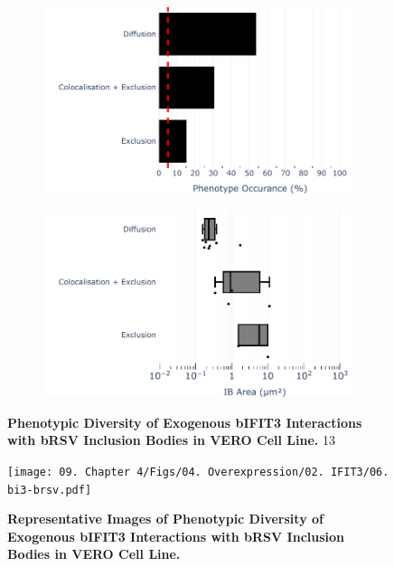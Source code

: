 \begin{figure}
    \begin{subfigure}{0.495\textwidth}
        \caption{}
        \includegraphics[width=1\linewidth]{09. Chapter 4/Figs/04. Overexpression/02. IFIT3/04. bar_i3_brsv.pdf} 
    \end{subfigure}
    \begin{subfigure}{0.495\textwidth}
        \caption{}
        \includegraphics[width=1\linewidth]{09. Chapter 4/Figs/04. Overexpression/02. IFIT3/05. box_i3_brsv.pdf}
    \end{subfigure}
    \caption[Phenotypic Diversity of Exogenous bIFIT3 Interactions with bRSV Inclusion Bodies in VERO Cell Line.]{\textbf{Phenotypic Diversity of Exogenous bIFIT3 Interactions with bRSV Inclusion Bodies in VERO Cell Line.} 13}
    \label{fig:Phenotypic Diversity of Exogenous bIFIT3 Interactions with bRSV Inclusion Bodies in VERO Cell Line}
\end{figure}

\begin{figure}
    \centering
    \texttt{[image: 09. Chapter 4/Figs/04. Overexpression/02. IFIT3/06. bi3-brsv.pdf]}
    \caption[Representative Images of Phenotypic Diversity of Exogenous bIFIT3 Interactions with bRSV Inclusion Bodies in VERO Cell Line.]{\textbf{Representative Images of Phenotypic Diversity of Exogenous bIFIT3 Interactions with bRSV Inclusion Bodies in VERO Cell Line.} }
    \label{fig:Representative Images of Phenotypic Diversity of Exogenous bIFIT3 Interactions with bRSV Inclusion Bodies in VERO Cell Line}
\end{figure}

